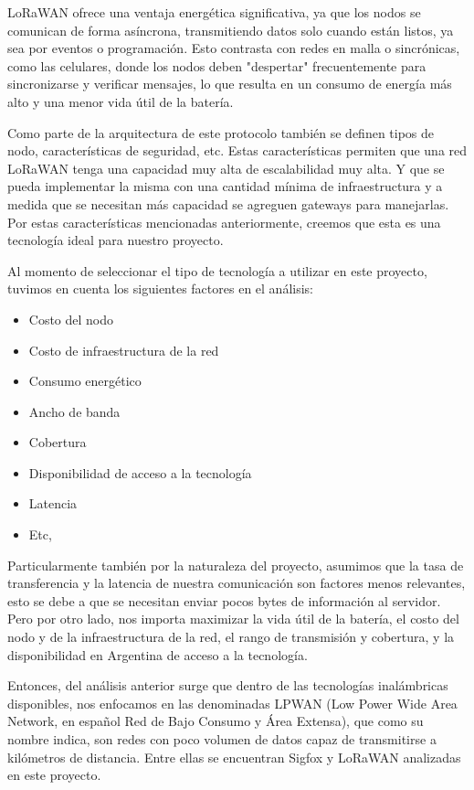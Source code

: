 LoRaWAN ofrece una ventaja energética significativa, ya que los nodos se comunican de forma asíncrona, transmitiendo datos solo cuando están listos, ya sea por eventos o programación. Esto contrasta con redes en malla o sincrónicas, como las celulares, donde los nodos deben "despertar" frecuentemente para sincronizarse y verificar mensajes, lo que resulta en un consumo de energía más alto y una menor vida útil de la batería.

Como parte de la arquitectura de este protocolo también se definen tipos de nodo, características de seguridad, etc. Estas características permiten que una red LoRaWAN tenga una capacidad muy alta de escalabilidad muy alta. Y que se pueda implementar la misma con una cantidad mínima de infraestructura y a medida que se necesitan más capacidad se agreguen gateways para manejarlas. Por estas características mencionadas anteriormente, creemos que esta es una tecnología ideal para nuestro proyecto.

Al momento de seleccionar el tipo de tecnología a utilizar en este proyecto, tuvimos en cuenta los siguientes factores en el análisis:

\begin{itemize}
    \item Costo del nodo
    \item Costo de infraestructura de la red
    \item Consumo energético
    \item Ancho de banda
    \item Cobertura
    \item Disponibilidad de acceso a la tecnología
    \item Latencia
    \item Etc,
\end{itemize}

Particularmente también por la naturaleza del proyecto, asumimos que la tasa de transferencia y la latencia de nuestra comunicación son factores menos relevantes, esto se debe a que se necesitan enviar pocos bytes de información al servidor. Pero por otro lado, nos importa maximizar la vida útil de la batería, el costo del nodo y de la infraestructura de la red, el rango de transmisión y cobertura, y la disponibilidad en Argentina de acceso a la tecnología.

Entonces, del análisis anterior surge que dentro de las tecnologías inalámbricas disponibles, nos enfocamos en las denominadas LPWAN  (Low Power Wide Area Network, en español Red de Bajo Consumo y Área Extensa),  que como su nombre indica, son redes con poco volumen de datos capaz de transmitirse a kilómetros de distancia. Entre ellas se encuentran Sigfox y LoRaWAN analizadas en este proyecto.

